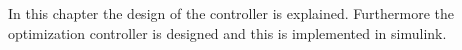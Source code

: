 In this chapter the design of the controller is explained. Furthermore the optimization controller is designed and this is implemented in simulink. 


